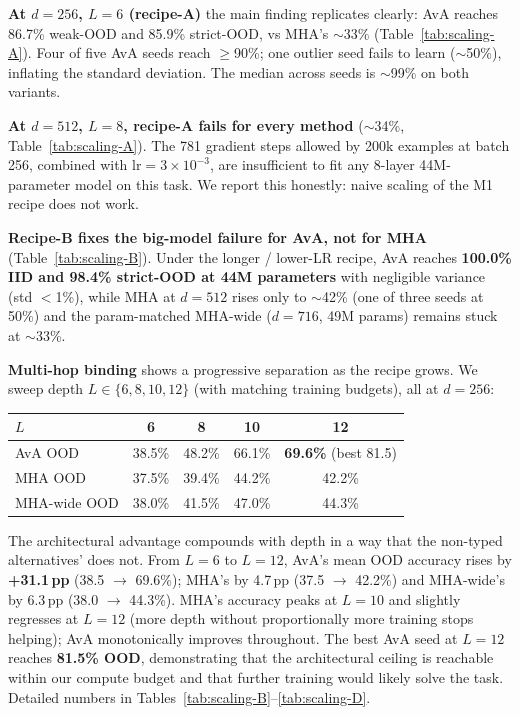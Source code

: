 \documentclass{article}
\begin{document}
\textbf{At $d{=}256$, $L{=}6$ (recipe-A)} the main finding replicates
clearly: AvA reaches 86.7\% weak-OOD and 85.9\% strict-OOD, vs
MHA's $\sim$33\% (Table~\ref{tab:scaling-A}). Four of five AvA
seeds reach $\ge$90\%; one outlier seed fails to learn ($\sim$50\%),
inflating the standard deviation. The median across seeds is
$\sim$99\% on both variants.

\textbf{At $d{=}512$, $L{=}8$, recipe-A fails for every method}
($\sim$34\%, Table~\ref{tab:scaling-A}). The 781 gradient steps
allowed by 200k examples at batch 256, combined with
$\mathrm{lr}{=}3\!\times\!10^{-3}$, are insufficient to fit any
8-layer 44M-parameter model on this task. We report this honestly:
naive scaling of the M1 recipe does not work.

\textbf{Recipe-B fixes the big-model failure for AvA, not for MHA}
(Table~\ref{tab:scaling-B}). Under the longer / lower-LR recipe,
AvA reaches \textbf{100.0\% IID and 98.4\% strict-OOD at 44M
parameters} with negligible variance (std $<$1\%), while MHA at
$d{=}512$ rises only to $\sim$42\% (one of three seeds at 50\%) and
the param-matched MHA-wide ($d{=}716$, 49M params) remains stuck at
$\sim$33\%.

\textbf{Multi-hop binding} shows a progressive separation as the
recipe grows. We sweep depth $L \in \{6, 8, 10, 12\}$ (with matching
training budgets), all at $d{=}256$:

\begin{center}
\small
\begin{tabular}{lcccc}
\toprule
$L$           & 6   & 8   & 10  & 12 \\
\midrule
AvA OOD       & 38.5\% & 48.2\% & 66.1\% & \textbf{69.6\%} (best 81.5) \\
MHA OOD       & 37.5\% & 39.4\% & 44.2\% & 42.2\% \\
MHA-wide OOD  & 38.0\% & 41.5\% & 47.0\% & 44.3\% \\
\bottomrule
\end{tabular}
\end{center}

The architectural advantage compounds with depth in a way that the
non-typed alternatives' does not. From $L{=}6$ to $L{=}12$, AvA's
mean OOD accuracy rises by \textbf{+31.1\,pp} (38.5 $\to$ 69.6\%);
MHA's by 4.7\,pp (37.5 $\to$ 42.2\%) and MHA-wide's by 6.3\,pp
(38.0 $\to$ 44.3\%). MHA's accuracy peaks at $L{=}10$ and slightly
regresses at $L{=}12$ (more depth without proportionally more
training stops helping); AvA monotonically improves throughout.
The best AvA seed at $L{=}12$ reaches \textbf{81.5\% OOD},
demonstrating that the architectural ceiling is reachable within
our compute budget and that further training would likely
solve the task. Detailed numbers in
Tables~\ref{tab:scaling-B}--\ref{tab:scaling-D}.
\end{document}

